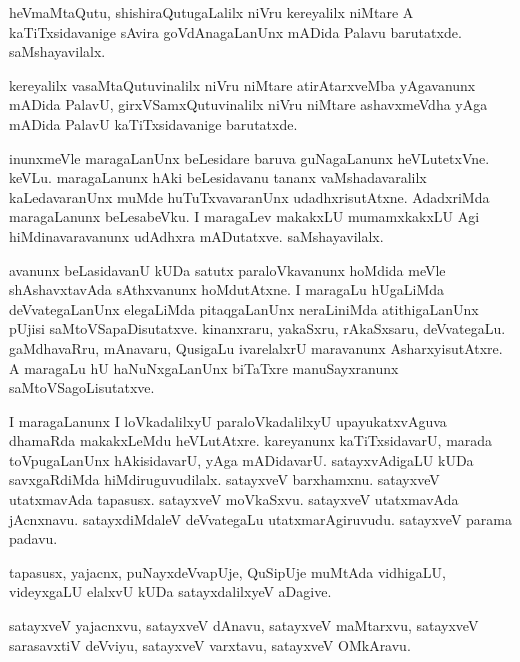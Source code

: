\documentclass{article}
\begin{document}
\begin{mn}%
heVmaMtaQutu, shishiraQutugaLalilx niVru kereyalilx niMtare A kaTiTxsidavanige sAvira 
goVdAnagaLanUnx mADida Palavu barutatxde. saMshayavilalx.
\end{mn}

\begin{mn}%
kereyalilx vasaMtaQutuvinalilx niVru niMtare atirAtarxveMba yAgavanunx mADida PalavU, 
girxVSamxQutuvinalilx niVru niMtare ashavxmeVdha yAga mADida PalavU kaTiTxsidavanige barutatxde.
\end{mn}

\begin{mn}%
inunxmeVle maragaLanUnx beLesidare baruva guNagaLanunx heVLutetxVne. keVLu. maragaLanunx hAki 
beLesidavanu tananx vaMshadavaralilx kaLedavaranUnx muMde huTuTxvavaranUnx udadhxrisutAtxne. 
AdadxriMda maragaLanunx beLesabeVku. I maragaLev makakxLU mumamxkakxLU Agi hiMdinavaravanunx 
udAdhxra mADutatxve. saMshayavilalx.
\end{mn}

\begin{mn}%
avanunx beLasidavanU kUDa satutx paraloVkavanunx hoMdida meVle shAshavxtavAda sAthxvanunx 
hoMdutAtxne. I maragaLu hUgaLiMda deVvategaLanUnx elegaLiMda pitaqgaLanUnx neraLiniMda 
atithigaLanUnx pUjisi saMtoVSapaDisutatxve. kinanxraru, yakaSxru, rAkaSxsaru, deVvategaLu. 
gaMdhavaRru, mAnavaru, QusigaLu ivarelalxrU maravanunx AsharxyisutAtxre. A maragaLu hU 
haNuNxgaLanUnx biTaTxre manuSayxranunx saMtoVSagoLisutatxve.
\end{mn}

\begin{mn}%
I maragaLanunx I loVkadalilxyU paraloVkadalilxyU upayukatxvAguva dhamaRda makakxLeMdu heVLutAtxre. 
kareyanunx kaTiTxsidavarU, marada toVpugaLanUnx hAkisidavarU, yAga mADidavarU. satayxvAdigaLU kUDa 
savxgaRdiMda hiMdiruguvudilalx. satayxveV barxhamxnu. satayxveV utatxmavAda tapasusx. satayxveV 
moVkaSxvu. satayxveV utatxmavAda jAcnxnavu. satayxdiMdaleV deVvategaLu utatxmarAgiruvudu. satayxveV 
parama padavu.
\end{mn}

\begin{mn}%
tapasusx, yajacnx, puNayxdeVvapUje, QuSipUje muMtAda vidhigaLU, videyxgaLU elalxvU kUDa 
satayxdalilxyeV aDagive.
\end{mn}

\begin{mn}%
satayxveV yajacnxvu, satayxveV dAnavu, satayxveV maMtarxvu, satayxveV sarasavxtiV deVviyu, satayxveV 
varxtavu, satayxveV OMkAravu.
\end{mn}
\end{document}
